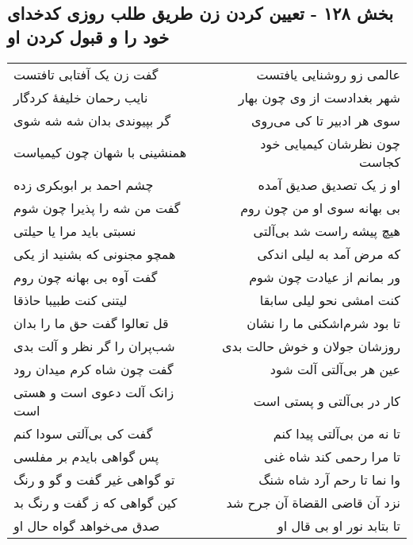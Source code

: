 \begin{center}
\section*{بخش ۱۲۸ - تعیین کردن زن طریق طلب روزی کدخدای خود را و قبول کردن او}
\label{sec:sh128}
\begin{longtable}{l p{0.5cm} r}
گفت زن یک آفتابی تافتست
&&
عالمی زو روشنایی یافتست
\\
نایب رحمان خلیفهٔ کردگار
&&
شهر بغدادست از وی چون بهار
\\
گر بپیوندی بدان شه شه شوی
&&
سوی هر ادبیر تا کی می‌روی
\\
همنشینی با شهان چون کیمیاست
&&
چون نظرشان کیمیایی خود کجاست
\\
چشم احمد بر ابوبکری زده
&&
او ز یک تصدیق صدیق آمده
\\
گفت من شه را پذیرا چون شوم
&&
بی بهانه سوی او من چون روم
\\
نسبتی باید مرا یا حیلتی
&&
هیچ پیشه راست شد بی‌آلتی
\\
همچو مجنونی که بشنید از یکی
&&
که مرض آمد به لیلی اندکی
\\
گفت آوه بی بهانه چون روم
&&
ور بمانم از عیادت چون شوم
\\
لیتنی کنت طبیبا حاذقا
&&
کنت امشی نحو لیلی سابقا
\\
قل تعالوا گفت حق ما را بدان
&&
تا بود شرم‌اشکنی ما را نشان
\\
شب‌پران را گر نظر و آلت بدی
&&
روزشان جولان و خوش حالت بدی
\\
گفت چون شاه کرم میدان رود
&&
عین هر بی‌آلتی آلت شود
\\
زانک آلت دعوی است و هستی است
&&
کار در بی‌آلتی و پستی است
\\
گفت کی بی‌آلتی سودا کنم
&&
تا نه من بی‌آلتی پیدا کنم
\\
پس گواهی بایدم بر مفلسی
&&
تا مرا رحمی کند شاه غنی
\\
تو گواهی غیر گفت و گو و رنگ
&&
وا نما تا رحم آرد شاه شنگ
\\
کین گواهی که ز گفت و رنگ بد
&&
نزد آن قاضی القضاة آن جرح شد
\\
صدق می‌خواهد گواه حال او
&&
تا بتابد نور او بی قال او
\\
\end{longtable}
\end{center}
